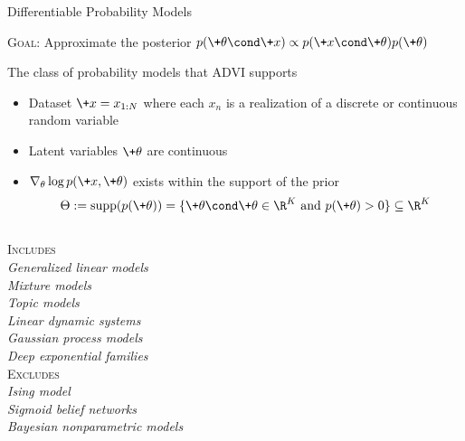\documentclass[10pt]{beamer}
\begin{document}
\begin{frame}{Differentiable Probability Models}


\textsc{Goal:} Approximate the posterior $p(\+\theta \cond \+x) \propto p(\+x \cond \+\theta) p(\+\theta)$

\vspace{.05in}
\begin{block}{The class of probability models that ADVI supports}

	\vspace{.1in}
	\begin{minipage}[t][.33\textheight]{\textwidth}
		
	\begin{itemize}
	\item Dataset $\+x=x_{1:N}$ where each $x_n$ is a realization of a discrete or continuous random variable 
	\item Latent variables $\+\theta$ are continuous 
	\item $\nabla_\theta \log p(\+x, \+\theta)$ exists within the support of the prior 
	\[\Theta := \text{supp}(p(\+\theta)) = \{  \+\theta \cond \+\theta \in \R^K \text{ and } p(\+\theta) > 0 \} \subseteq \R^K \]
	\end{itemize}

	\end{minipage}
\end{block}	

\vspace{.05in}
	\begin{columns}[t]
	\textsc{Includes}  \\
	\textit{Generalized linear models} \\ %
	\textit{Mixture models} \\
	\textit{Topic models} \\  %
	\textit{Linear dynamic systems} \\
	\textit{Gaussian process models} \\
	\textit{Deep exponential families} \\
	\textsc{Excludes} \\
	\textit{Ising model} \\
	\textit{Sigmoid belief networks} \\
	\textit{Bayesian nonparametric models}
	\vfill
	
	\end{columns}
	

\end{frame}
\end{document}
